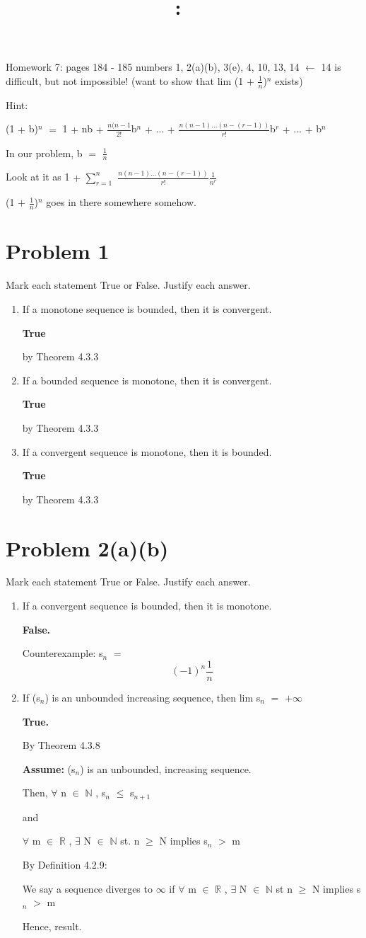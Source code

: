 \documentclass{article}
\title{
    \vspace{2in}
    \textmd{\textbf{\hmwkClass:\ \hmwkTitle}}\\
    \normalsize\vspace{0.1in}\small\vspace{0.1in}\large{\textit{\hmwkClassInstructor}}
    \vspace{3in}
}
\author{\hmwkAuthorName}
\date{}
\newcommand{\mt}[1]{\ensuremath{#1}}
\newcommand\bsc[2][\DefaultOpt]{%
  \def\DefaultOpt{#2}%
  \section[#1]{#2}%
}
\newcommand{\balist}{\begin{enumerate}[label=\alph*.]}
\newcommand{\elist}{\end{enumerate}}
\newcommand{\as}[1]{\textbf{Assume: } #1}
\newcommand{\br}{\mt{\mathbb{R}} }       %
\newcommand{\bn}{\mt{\mathbb{N}} }       %
\newcommand{\fa}{\mt{\forall} }          %
\newcommand{\mem}{\mt{\in} }
\newcommand{\exs}{\mt{\exists} }
\newcommand{\lla}{ \mt{\longleftarrow} }  %
\newcommand{\prn}[1]{(#1)}
\newcommand{\ps}{\mt{+} }
\newcommand{\gr}{\mt{>} }
\newcommand{\lse}{\mt{\leq} }
\newcommand{\gre}{\mt{\geq} }
\newcommand{\eql}{\mt{=} }
\newcommand{\uw}[2]{#1\mt{_{#2}}}
\newcommand{\uf}[2]{#1\mt{^{#2}}}
\newcommand{\frc}[2]{\mt{\frac{#1}{#2}}}
\newcommand{\eqn}[1]{\[#1\]}
\begin{document}
Homework 7: pages 184 - 185 numbers 1, 2(a)(b), 3(e), 4, 10, 13, 14 \lla 14 is difficult, but not impossible! (want to show that lim (1 \ps \frc{1}{n})$^n$ exists)

Hint:

\uf{\prn{1 \ps b}}{n} \eql 1 \ps nb \ps \frc{n(n - 1}{2!}\uf{b}{n} \ps ... \ps \frc{n(n - 1)... (n - (r - 1))}{r!}\uf{b}{r} \ps ... \ps \uf{b}{n}

In our problem, b \eql \frc{1}{n}

Look at it as 1 \ps $\sum_{r = 1}^n$ \frc{n(n - 1)...(n - (r - 1))}{r!}\frc{1}{n^r}

\prn{1 \ps \frc{1}{n}}$^n$ goes in there somewhere somehow.

\bsc{Problem 1}{
Mark each statement True or False. Justify each answer.
\balist
\item If a monotone sequence is bounded, then it is convergent.
	
	\textbf{True}
	
	by Theorem 4.3.3
\item If a bounded sequence is monotone, then it is convergent.
	
	\textbf{True}
	
	by Theorem 4.3.3
\item If a convergent sequence is monotone, then it is bounded.
	
	\textbf{True}
	
	by Theorem 4.3.3
\elist
}

\bsc{Problem 2(a)(b)}{
Mark each statement True or False. Justify each answer.
\balist
\item If a convergent sequence is bounded, then it is monotone.
	
	\textbf{False.}
	
	Counterexample: \uw{s}{n} \eql
	\eqn{(-1)^n\frac{1}{n}}
\item If \prn{\uw{s}{n}} is an unbounded increasing sequence, then lim \uw{s}{n} \eql $+\infty$
	
	\textbf{True.}
	
	By Theorem 4.3.8
	
	\as{\prn{\uw{s}{n}} is an unbounded, increasing sequence.}
	
	Then, \fa n \mem \bn, \uw{s}{n} \lse \uw{s}{n + 1}
	
	and
	
	\fa m \mem \br, \exs N \mem \bn st. n \gre N implies \uw{s}{n} \gr m
	
	By Definition 4.2.9:
	
	We say a sequence diverges to $\infty$ if \fa m \mem \br, \exs N \mem \bn st n \gre N implies \uw{s}{n} \gr m
	
	Hence, result.
	
	
\elist

}
\end{document}
